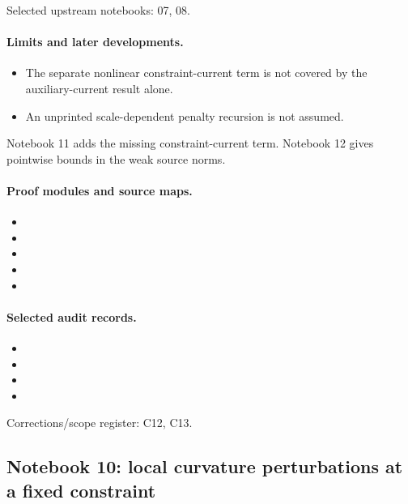 Selected upstream notebooks: 07, 08.\par

\paragraph{Limits and later developments.}
\begin{itemize}
\item The separate nonlinear constraint-current term is not covered by the auxiliary-current result alone.
\item An unprinted scale-dependent penalty recursion is not assumed.
\end{itemize}

Notebook 11 adds the missing constraint-current term. Notebook 12 gives pointwise bounds in the weak source norms.

\paragraph{Proof modules and source maps.}
\begingroup\small
\begin{itemize}
\item {}
\item {}
\item {}
\item {}
\item {}
\end{itemize}
\endgroup

\paragraph{Selected audit records.}
\begingroup\small
\begin{itemize}
\item {}
\item {}
\item {}
\item {}
\end{itemize}
\endgroup
Corrections/scope register: C12, C13.\par

\subsection{Notebook 10: local curvature perturbations at a fixed constraint}
\label{hnc-10}
\noindent{}\par

